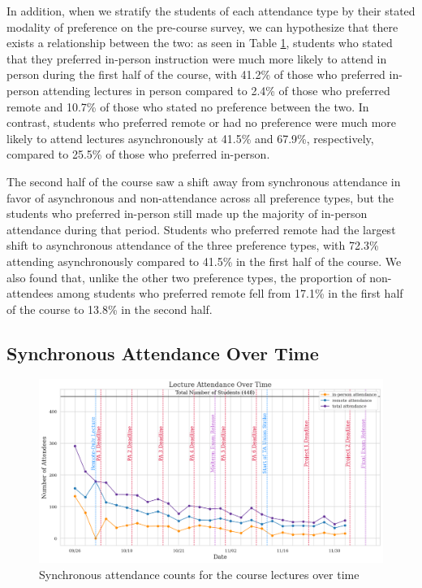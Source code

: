 \begin{table}[H]
\begin{tabular}{|c|c|cccc|c|c|}
    \end{tabular}
    \label{tab:attendance-initial-preference}
\end{table}

In addition, when we stratify the students of each attendance type by their stated modality of preference on the pre-course survey, we can hypothesize that there exists a relationship between the two: as seen in Table \ref{tab:attendance-initial-preference}, students who stated that they preferred in-person instruction were much more likely to attend in person during the first half of the course, with 41.2\% of those who preferred in-person attending lectures in person compared to 2.4\% of those who preferred remote and 10.7\% of those who stated no preference between the two. In contrast, students who preferred remote or had no preference were much more likely to attend lectures asynchronously at 41.5\% and 67.9\%, respectively, compared to 25.5\% of those who preferred in-person.

The second half of the course saw a shift away from synchronous attendance in favor of asynchronous and non-attendance across all preference types, but the students who preferred in-person still made up the majority of in-person attendance during that period. Students who preferred remote had the largest shift to asynchronous attendance of the three preference types, with 72.3\% attending asynchronously compared to 41.5\% in the first half of the course. We also found that, unlike the other two preference types, the proportion of non-attendees among students who preferred remote fell from 17.1\% in the first half of the course to 13.8\% in the second half.

\subsection{Synchronous Attendance Over Time}

\begin{figure}[H]
    \vspace{5mm}
    \centering
    \includegraphics[width= 16cm]{figures/attendance_over_time.png}
    \caption{Synchronous attendance counts for the course lectures over time}
    \label{fig:attendance_over_time}
\end{figure}

